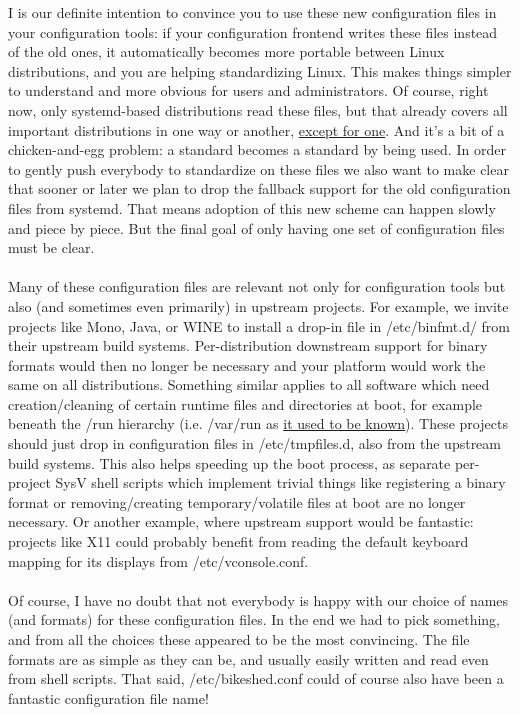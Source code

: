 \documentclass[titlepage]{article}
\begin{document}
I is our definite intention to convince you to use these new configuration files in your configuration tools: if your configuration frontend writes these files instead of the old ones, it automatically becomes more portable between Linux distributions, and you are helping standardizing Linux. This makes things simpler to understand and more obvious for users and administrators. Of course, right now, only systemd-based distributions read these files, but that already covers all important distributions in one way or another, \href{https://www.ubuntu.com/}{except for one}. And it's a bit of a chicken-and-egg problem: a standard becomes a standard by being used. In order to gently push everybody to standardize on these files we also want to make clear that sooner or later we plan to drop the fallback support for the old configuration files from systemd. That means adoption of this new scheme can happen slowly and piece by piece. But the final goal of only having one set of configuration files must be clear.
\\
\\
Many of these configuration files are relevant not only for configuration tools but also (and sometimes even primarily) in upstream projects. For example, we invite projects like Mono, Java, or WINE to install a drop-in file in /etc/binfmt.d/ from their upstream build systems. Per-distribution downstream support for binary formats would then no longer be necessary and your platform would work the same on all distributions. Something similar applies to all software which need creation/cleaning of certain runtime files and directories at boot, for example beneath the /run hierarchy (i.e. /var/run as \href{https://lwn.net/Articles/436012/}{it used to be known}). These projects should just drop in configuration files in /etc/tmpfiles.d, also from the upstream build systems. This also helps speeding up the boot process, as separate per-project SysV shell scripts which implement trivial things like registering a binary format or removing/creating temporary/volatile files at boot are no longer necessary. Or another example, where upstream support would be fantastic: projects like X11 could probably benefit from reading the default keyboard mapping for its displays from /etc/vconsole.conf.
\\
\\
Of course, I have no doubt that not everybody is happy with our choice of names (and formats) for these configuration files. In the end we had to pick something, and from all the choices these appeared to be the most convincing. The file formats are as simple as they can be, and usually easily written and read even from shell scripts. That said, /etc/bikeshed.conf could of course also have been a fantastic configuration file name!
\end{document}
